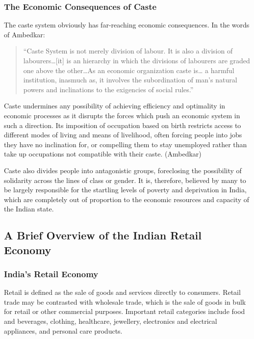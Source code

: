 \documentclass[]{article}
\begin{document}
\subsubsection{The Economic Consequences of
Caste}\label{the-economic-consequences-of-caste}

The caste system obviously has far-reaching economic consequences. In
the words of Ambedkar:

\begin{quote}
``Caste System is not merely division of labour. It is also a division
of labourers\ldots{}{[}it{]} is an hierarchy in which the divisions of
labourers are graded one above the other\ldots{}As an economic
organization caste is\ldots{} a harmful institution, inasmuch as, it
involves the subordination of man's natural powers and inclinations to
the exigencies of social rules.''
\end{quote}

Caste undermines any possibility of achieving efficiency and optimality
in economic processes as it disrupts the forces which push an economic
system in such a direction. Its imposition of occupation based on birth
restricts access to different modes of living and means of livelihood,
often forcing people into jobs they have no inclination for, or
compelling them to stay unemployed rather than take up occupations not
compatible with their caste. (Ambedkar)

Caste also divides people into antagonistic groups, foreclosing the
possibility of solidarity across the lines of class or gender. It is,
therefore, believed by many to be largely responsible for the startling
levels of poverty and deprivation in India, which are completely out of
proportion to the economic resources and capacity of the Indian state.

\subsection{A Brief Overview of the Indian Retail
Economy}\label{a-brief-overview-of-the-indian-retail-economy}

\subsubsection{India's Retail Economy}\label{indias-retail-economy}

Retail is defined as the sale of goods and services directly to
consumers. Retail trade may be contrasted with wholesale trade, which is
the sale of goods in bulk for retail or other commercial purposes.
Important retail categories include food and beverages, clothing,
healthcare, jewellery, electronics and electrical appliances, and
personal care products.
\end{document}
